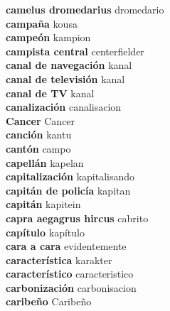 \textbf{ camelus dromedarius  } dromedario \\
\textbf{ campaña  } kousa \\
\textbf{ campeón  } kampion \\
\textbf{ campista central  } centerfielder \\
\textbf{ canal de navegación  } kanal \\
\textbf{ canal de televisión  } kanal \\
\textbf{ canal de TV  } kanal \\
\textbf{ canalización  } canalisacion \\
\textbf{ Cancer  } Cancer \\
\textbf{ canción  } kantu \\
\textbf{ cantón  } campo \\
\textbf{ capellán  } kapelan \\
\textbf{ capitalización  } kapitalisando \\
\textbf{ capitán de policía  } kapitan \\
\textbf{ capitán  } kapitein \\
\textbf{ capra aegagrus hircus  } cabrito \\
\textbf{ capítulo  } kapítulo \\
\textbf{ cara a cara  } evidentemente \\
\textbf{ característica  } karakter \\
\textbf{ característico  } caracteristico \\
\textbf{ carbonización  } carbonisacion \\
\textbf{ caribeño  } Caribeño \\
